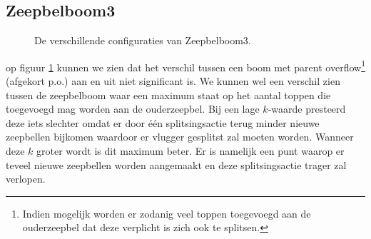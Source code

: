 \documentclass[12pt,hidelinks]{article}
\begin{document}
    \subsection*{Zeepbelboom3}
    \begin{figure}[H]
        \caption{De verschillende configuraties van Zeepbelboom3.}
        \label{figZB3}
    \end{figure}
    op figuur \ref{figZB3} kunnen we zien dat het verschil tussen een boom met parent overflow\footnote{Indien mogelijk worden er zodanig veel toppen toegevoegd aan de ouderzeepbel dat deze verplicht is zich ook te splitsen.} (afgekort p.o.) aan en uit niet significant is. We kunnen wel een verschil zien tussen de zeepbelboom waar een maximum staat op het aantal toppen
    die toegevoegd mag worden aan de ouderzeepbel.
    Bij een lage $k$-waarde presteerd deze iets slechter omdat er door één splitsingsactie terug minder nieuwe zeepbellen bijkomen waardoor er vlugger gesplitst zal moeten worden.
    Wanneer deze $k$ groter wordt is dit maximum beter. Er is namelijk een punt waarop er teveel nieuwe zeepbellen worden aangemaakt en deze splitsingsactie trager zal verlopen.
\end{document}

